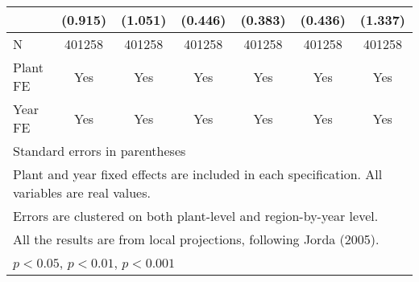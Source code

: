 \begin{table}[htbp]
\begin{tabular}{l*{6}{c}}
                &  (0.915)         &  (1.051)         &  (0.446)         &  (0.383)         &  (0.436)         &  (1.337)         \\
\midrule
N               &   401258         &   401258         &   401258         &   401258         &   401258         &   401258         \\
Plant FE        &      Yes         &      Yes         &      Yes         &      Yes         &      Yes         &      Yes         \\
Year FE         &      Yes         &      Yes         &      Yes         &      Yes         &      Yes         &      Yes         \\
\bottomrule
\multicolumn{7}{l}{\footnotesize Standard errors in parentheses}\\
\multicolumn{7}{l}{\footnotesize Plant and year fixed effects are included in each specification. All variables are real values.}\\
\multicolumn{7}{l}{\footnotesize Errors are clustered on both plant-level and region-by-year level.}\\
\multicolumn{7}{l}{\footnotesize All the results are from local projections, following Jorda (2005).}\\
\multicolumn{7}{l}{\footnotesize \sym{*} \(p<0.05\), \sym{**} \(p<0.01\), \sym{***} \(p<0.001\)}\\
\end{tabular}
\end{table}
